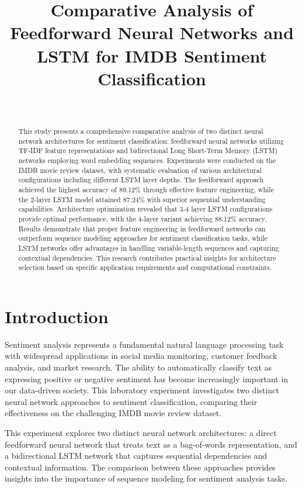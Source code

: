 \documentclass[a4paper, journal]{IEEEtran}
\title{Comparative Analysis of Feedforward Neural Networks and LSTM for IMDB Sentiment Classification}
\author{
    \IEEEauthorblockN{Dinanath Padhya\IEEEauthorrefmark{1}, Krishna Acharya\IEEEauthorrefmark{2}}\\
    \IEEEauthorblockA{\IEEEauthorrefmark{1}THA078BEI010 \quad \IEEEauthorrefmark{2}THA078BEI020\\
    Department of Electronics, Communication and Information Engineering\\
    Thapathali Campus, IOE, Tribhuvan University, Nepal\\
    }
}
\begin{document}
\maketitle

\begin{abstract}
This study presents a comprehensive comparative analysis of two distinct neural network architectures for sentiment classification: feedforward neural networks utilizing TF-IDF feature representations and bidirectional Long Short-Term Memory (LSTM) networks employing word embedding sequences. Experiments were conducted on the IMDB movie review dataset, with systematic evaluation of various architectural configurations including different LSTM layer depths. The feedforward approach achieved the highest accuracy of 89.12\% through effective feature engineering, while the 2-layer LSTM model attained 87.24\% with superior sequential understanding capabilities. Architecture optimization revealed that 3-4 layer LSTM configurations provide optimal performance, with the 4-layer variant achieving 88.12\% accuracy. Results demonstrate that proper feature engineering in feedforward networks can outperform sequence modeling approaches for sentiment classification tasks, while LSTM networks offer advantages in handling variable-length sequences and capturing contextual dependencies. This research contributes practical insights for architecture selection based on specific application requirements and computational constraints.
\end{abstract}

\section{Introduction}

Sentiment analysis represents a fundamental natural language processing task with widespread applications in social media monitoring, customer feedback analysis, and market research. The ability to automatically classify text as expressing positive or negative sentiment has become increasingly important in our data-driven society. This laboratory experiment investigates two distinct neural network approaches to sentiment classification, comparing their effectiveness on the challenging IMDB movie review dataset.

This experiment explores two distinct neural network architectures: a direct feedforward neural network that treats text as a bag-of-words representation, and a bidirectional LSTM network that captures sequential dependencies and contextual information. The comparison between these approaches provides insights into the importance of sequence modeling for sentiment analysis tasks.
\end{document}
